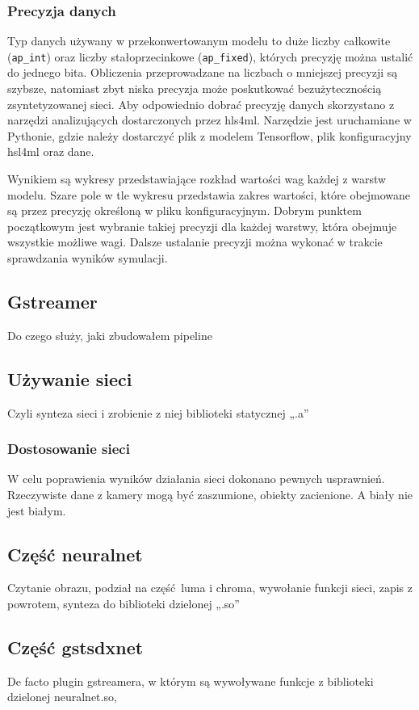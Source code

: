 \documentclass[12pt, oneside]{article}
\begin{document}
\subsubsection{Precyzja danych}
Typ danych używany w przekonwertowanym modelu to duże liczby całkowite
(\lstinline{ap_int}) oraz liczby stałoprzecinkowe (\lstinline{ap_fixed}),
których precyzję można ustalić do jednego bita.
Obliczenia przeprowadzane na liczbach o mniejszej
precyzji są szybsze, natomiast zbyt niska precyzja może poskutkować
bezużytecznością zsyntetyzowanej sieci. Aby odpowiednio dobrać precyzję
danych skorzystano z narzędzi analizujących dostarczonych przez hls4ml.
Narzędzie jest uruchamiane w Pythonie, gdzie należy dostarczyć plik z modelem
Tensorflow, plik konfiguracyjny hsl4ml oraz dane.

Wynikiem są wykresy przedstawiające 
rozkład wartości wag każdej z warstw modelu. Szare pole w tle wykresu
przedstawia zakres wartości, które obejmowane są przez precyzję określoną
w pliku konfiguracyjnym. Dobrym punktem początkowym jest wybranie takiej
precyzji dla każdej warstwy, która obejmuje wszystkie możliwe wagi.
Dalsze ustalanie precyzji można wykonać w trakcie sprawdzania wyników
symulacji.

\subsection{Gstreamer}
Do czego służy, jaki zbudowałem pipeline

\subsection{Używanie sieci}
Czyli synteza sieci i zrobienie z niej biblioteki statycznej „.a” 
\subsubsection{Dostosowanie sieci}
W celu poprawienia wyników działania sieci dokonano pewnych usprawnień.
Rzeczywiste dane z kamery mogą być zaszumione, obiekty zacienione.
A biały nie jest białym.


\subsection{Część neuralnet}
Czytanie obrazu, podział na część luma i chroma, wywołanie funkcji sieci,
zapis z powrotem, synteza do biblioteki dzielonej „.so”

\subsection{Część gstsdxnet}
De facto plugin gstreamera, w którym są wywoływane funkcje z biblioteki
dzielonej neuralnet.so, 
\end{document}
